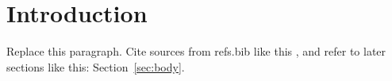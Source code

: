\section{Introduction}\label{sec:introduction}
Replace this paragraph. Cite sources from refs.bib like this
\cite{lamport1994latex}, and refer to later sections like this:
Section~\ref{sec:body}.
